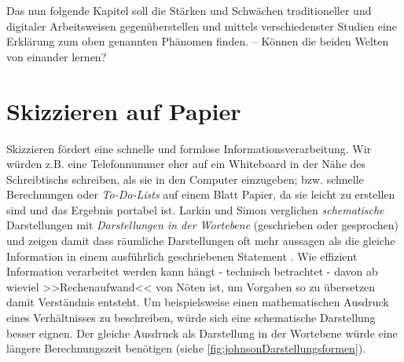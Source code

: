\medskip Das nun folgende Kapitel soll die Stärken und Schwächen traditioneller und digitaler Arbeitsweisen gegenüberstellen und mittels verschiedenster Studien eine Erklärung zum oben genannten Phänomen finden. -- Können die beiden Welten von einander lernen?

\section{Skizzieren auf Papier}
Skizzieren fördert eine schnelle und formlose Informationsverarbeitung. Wir würden z.B. eine Telefonnummer eher auf ein Whiteboard in der Nähe des Schreibtischs schreiben, als sie in den Computer einzugeben; bzw. schnelle Berechnungen oder \emph{To-Do-Lists} auf einem Blatt Papier, da sie leicht zu erstellen sind und das Ergebnis portabel ist.
Larkin und Simon verglichen \emph{schematische} Darstellungen mit \emph{Darstellungen in der Wortebene} (geschrieben oder gesprochen) und zeigen damit dass räumliche Darstellungen oft mehr aussagen als die gleiche Information in einem ausführlich geschriebenen Statement \citep{Larkin:1987}. Wie effizient Information verarbeitet werden kann hängt - technisch betrachtet - davon ab wieviel >>Rechenaufwand<< von Nöten ist, um Vorgaben so zu übersetzen damit Verständnis entsteht. Um beispielsweise einen mathematischen Ausdruck eines Verhältnisses zu beschreiben, würde sich eine schematische Darstellung besser eignen. Der gleiche Ausdruck als Darstellung in der Wortebene würde eine längere Berechnungszeit benötigen (siehe \autoref{fig:johnsonDarstellungsformen}).

